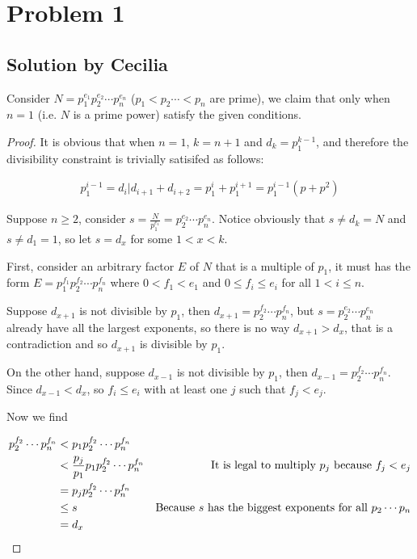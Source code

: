 \section*{Problem 1}

\subsection*{Solution by Cecilia}


Consider $ N = p_1^{e_1} p_2^{e_2} \cdots p_n^{e_n} $ ($ p_1 < p_2 \cdots < p_n $ are prime), we claim that only when $ n = 1 $ (i.e. $ N $ is a prime power) satisfy the given conditions.

\begin{proof}
It is obvious that when $ n = 1 $, $ k = n + 1 $ and $ d_k = p_1^{k - 1} $, and therefore the divisibility constraint is trivially satisifed as follows:

\begin{eqnarray*}
    p_1^{i - 1} = d_i | d_{i + 1} + d_{i + 2} = p_1^i + p_1^{i + 1} = p_1^{i-1}(p + p^2)
\end{eqnarray*}

Suppose $ n \ge 2 $, consider $ s = \frac{N}{p_1^{e_1}} = p_2^{e_2} \cdots p_n^{e_n} $. Notice obviously that $ s \ne d_k = N $ and $ s \ne d_1 = 1 $, so let $ s = d_x $ for some $ 1 < x < k $.

First, consider an arbitrary factor $ E $ of $ N $ that is a multiple of $ p_1 $, it must has the form $ E = p_1^{f_1} p_2^{f_2} \cdots p_n^{f_n} $ where $ 0 < f_1 < e_1 $ and $ 0 \le f_i \le e_i $ for all $ 1 < i \le n $.

Suppose $ d_{x+1} $ is not divisible by $ p_1 $, then $ d_{x+1} = p_2^{f_2} \cdots p_n^{f_n} $, but $ s = p_2^{e_2} \cdots p_n^{e_n} $ already have all the largest exponents, so there is no way $ d_{x+1} > d_x $, that is a contradiction and so $ d_{x+1} $ is divisible by $ p_1 $.

On the other hand, suppose $ d_{x-1} $ is not divisible by $ p_1 $, then $ d_{x-1} = p_2^{f_2} \cdots p_n^{f_n} $. Since $ d_{x-1} < d_x $, so $ f_i \le e_i $ with at least one $ j $ such that $ f_j < e_j $.

Now we find 

\begin{align*}
      p_2^{f_2} \cdots p_n^{f_n} &<   p_1 p_2^{f_2} \cdots p_n^{f_n} \\
                                 &<   \frac{p_j}{p_1} p_1 p_2^{f_2} \cdots p_n^{f_n} &\text{It is legal to multiply $ p_j $ because $ f_j < e_j $} \\
                                 &=   p_j p_2^{f_2} \cdots p_n^{f_n} \\
                                 &\le s &\text{Because $ s $ has the biggest exponents for all $ p_2 \cdots p_n $} \\
                                 &=   d_x
\end{align*}


\end{proof}

